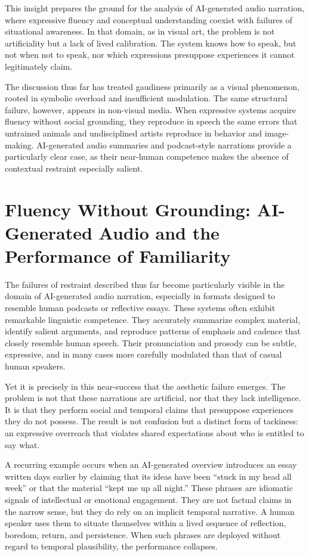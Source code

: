 \documentclass[12pt]{article}
\begin{document}
This insight prepares the ground for the analysis of AI-generated audio narration, where expressive fluency and conceptual understanding coexist with failures of situational awareness. In that domain, as in visual art, the problem is not artificiality but a lack of lived calibration. The system knows how to speak, but not when not to speak, nor which expressions presuppose experiences it cannot legitimately claim.

The discussion thus far has treated gaudiness primarily as a visual phenomenon, rooted in symbolic overload and insufficient modulation. The same structural failure, however, appears in non-visual media. When expressive systems acquire fluency without social grounding, they reproduce in speech the same errors that untrained animals and undisciplined artists reproduce in behavior and image-making. AI-generated audio summaries and podcast-style narrations provide a particularly clear case, as their near-human competence makes the absence of contextual restraint especially salient.

\section{Fluency Without Grounding: AI-Generated Audio and the Performance of Familiarity}

The failures of restraint described thus far become particularly visible in the domain of AI-generated audio narration, especially in formats designed to resemble human podcasts or reflective essays. These systems often exhibit remarkable linguistic competence. They accurately summarize complex material, identify salient arguments, and reproduce patterns of emphasis and cadence that closely resemble human speech. Their pronunciation and prosody can be subtle, expressive, and in many cases more carefully modulated than that of casual human speakers.

Yet it is precisely in this near-success that the aesthetic failure emerges. The problem is not that these narrations are artificial, nor that they lack intelligence. It is that they perform social and temporal claims that presuppose experiences they do not possess. The result is not confusion but a distinct form of tackiness: an expressive overreach that violates shared expectations about who is entitled to say what.

A recurring example occurs when an AI-generated overview introduces an essay written days earlier by claiming that its ideas have been “stuck in my head all week” or that the material “kept me up all night.” These phrases are idiomatic signals of intellectual or emotional engagement. They are not factual claims in the narrow sense, but they do rely on an implicit temporal narrative. A human speaker uses them to situate themselves within a lived sequence of reflection, boredom, return, and persistence. When such phrases are deployed without regard to temporal plausibility, the performance collapses.
\end{document}
